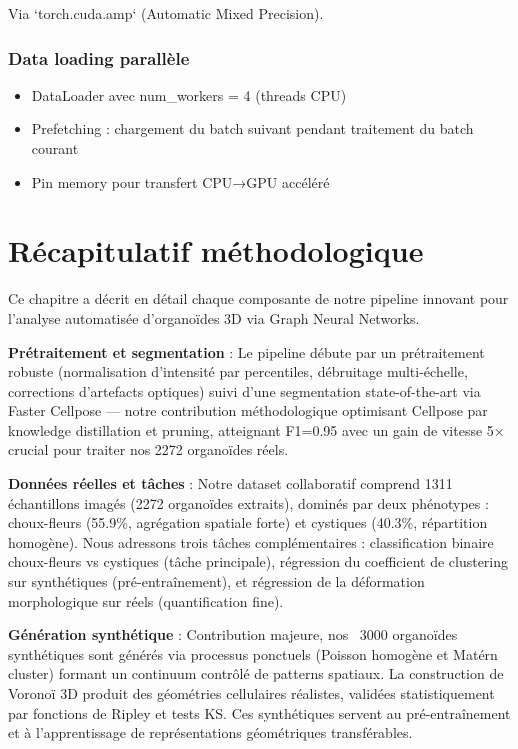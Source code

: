 Via `torch.cuda.amp` (Automatic Mixed Precision).

\subsubsection{Data loading parallèle}

\begin{itemize}
    \item DataLoader avec num\_workers = 4 (threads CPU)
    \item Prefetching : chargement du batch suivant pendant traitement du batch courant
    \item Pin memory pour transfert CPU→GPU accéléré
\end{itemize}

\section{Récapitulatif méthodologique}

Ce chapitre a décrit en détail chaque composante de notre pipeline innovant pour l'analyse automatisée d'organoïdes 3D via Graph Neural Networks.

\textbf{Prétraitement et segmentation} : Le pipeline débute par un prétraitement robuste (normalisation d'intensité par percentiles, débruitage multi-échelle, corrections d'artefacts optiques) suivi d'une segmentation state-of-the-art via Faster Cellpose — notre contribution méthodologique optimisant Cellpose par knowledge distillation et pruning, atteignant F1=0.95 avec un gain de vitesse 5× crucial pour traiter nos 2272 organoïdes réels.

\textbf{Données réelles et tâches} : Notre dataset collaboratif comprend 1311 échantillons imagés (2272 organoïdes extraits), dominés par deux phénotypes : choux-fleurs (55.9\%, agrégation spatiale forte) et cystiques (40.3\%, répartition homogène). Nous adressons trois tâches complémentaires : classification binaire choux-fleurs vs cystiques (tâche principale), régression du coefficient de clustering sur synthétiques (pré-entraînement), et régression de la déformation morphologique sur réels (quantification fine).

\textbf{Génération synthétique} : Contribution majeure, nos ~3000 organoïdes synthétiques sont générés via processus ponctuels (Poisson homogène et Matérn cluster) formant un continuum contrôlé de patterns spatiaux. La construction de Voronoï 3D produit des géométries cellulaires réalistes, validées statistiquement par fonctions de Ripley et tests KS. Ces synthétiques servent au pré-entraînement et à l'apprentissage de représentations géométriques transférables.

